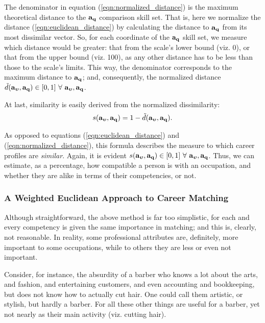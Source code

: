 \documentclass{article}
\begin{document}
The denominator in equation (\ref{eqn:normalized_distance}) is the maximum theoretical distance to the $\vb{a_q}$ comparison skill set. That is, here we normalize the distance (\ref{eqn:euclidean_distance}) by calculating the distance to $\vb{a_q}$ from its most dissimilar vector. So, for each coordinate of the $\vb{a_{q}}$ skill set, we measure which distance would be greater: that from the scale's lower bound (viz. 0), or that from the upper bound (viz. 100), as any other distance has to be less than those to the scale's limits. This way, the denominator corresponds to the maximum distance to $\vb{a_{q}}$; and, consequently, the normalized distance $\tilde{d}(\vb{a_{\boldsymbol{\upsilon}}}, \vb{a_{q}}) \in [0,1] \ \forall \ \vb{a_{\boldsymbol{\upsilon}}}, \vb{a_{q}}$.

At last, similarity is easily derived from the normalized dissimilarity:
\begin{gather}
\label{eqn:similarity}
    s(\vb{a_{\boldsymbol{\upsilon}}}, \vb{a_{q}}) = 1 - \tilde{d}(\vb{a_{\boldsymbol{\upsilon}}}, \vb{a_{q}}) 
.\end{gather}

As opposed to equations (\ref{eqn:euclidean_distance}) and (\ref{eqn:normalized_distance}), this formula describes the measure to which career profiles are \textit{similar}. Again, it is evident $s(\vb{a_{\boldsymbol{\upsilon}}}, \vb{a_{q}}) \in [0,1] \ \forall \ \vb{a_{\boldsymbol{\upsilon}}}, \vb{a_{q}}$. Thus, we can estimate, as a percentage, how compatible a person is with an occupation, and whether they are alike in terms of their competencies, or not.

\subsubsection{A Weighted Euclidean Approach to Career Matching}
Although straightforward, the above method is far too simplistic, for each and every competency is given the same importance in matching; and this is, clearly, not reasonable. In reality, some professional attributes are, definitely, more important to some occupations, while to others they are less or even not important.

Consider, for instance, the absurdity of a barber who knows a lot about the arts, and fashion, and entertaining customers, and even accounting and bookkeeping, but does not know how to actually cut hair. One could call them artistic, or stylish, but hardly a barber. For all these other things are useful for a barber, yet not nearly as their main activity (viz. cutting hair).
\end{document}
